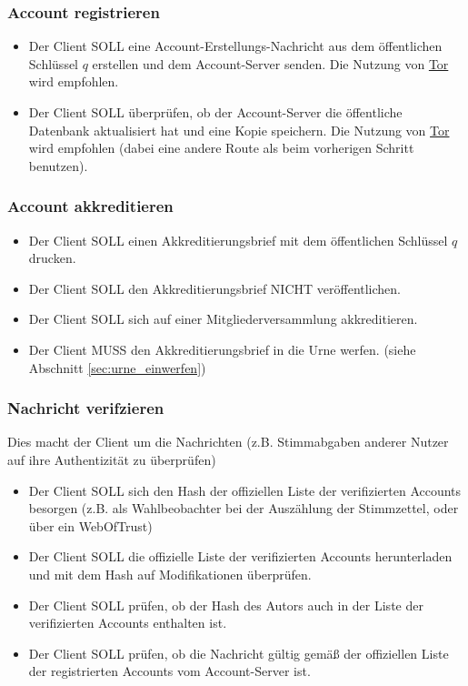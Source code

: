\documentclass[a4paper,10pt]{article}
\begin{document}
\subsubsection{Account registrieren}
\begin{itemize}
 \item Der Client SOLL eine Account-Erstellungs-Nachricht aus dem öffentlichen Schlüssel $q$ erstellen und dem Account-Server senden. Die Nutzung von \href{https://www.torproject.org/}{Tor} wird empfohlen.
 \item Der Client SOLL überprüfen, ob der Account-Server die öffentliche Datenbank aktualisiert hat und eine Kopie speichern. Die Nutzung von \href{https://www.torproject.org/}{Tor} wird empfohlen (dabei eine andere Route als beim vorherigen Schritt benutzen).
\end{itemize}

\subsubsection{Account akkreditieren}
\begin{itemize}
 \item Der Client SOLL einen Akkreditierungsbrief mit dem öffentlichen Schlüssel $q$ drucken.
 \item Der Client SOLL den Akkreditierungsbrief NICHT veröffentlichen. 
 \item Der Client SOLL sich auf einer Mitgliederversammlung akkreditieren.
 \item Der Client MUSS den Akkreditierungsbrief in die Urne werfen. (siehe Abschnitt \ref{sec:urne_einwerfen})
\end{itemize}

\subsubsection{Nachricht verifzieren}
Dies macht der Client um die Nachrichten (z.B. Stimmabgaben anderer Nutzer auf ihre Authentizität zu überprüfen)
\begin{itemize}
 \item Der Client SOLL sich den Hash der offiziellen Liste der verifizierten Accounts besorgen (z.B. als Wahlbeobachter bei der Auszählung der Stimmzettel, oder über ein WebOfTrust)
 \item Der Client SOLL die offizielle Liste der verifizierten Accounts herunterladen und mit dem Hash auf Modifikationen überprüfen.
 \item Der Client SOLL prüfen, ob der Hash des Autors auch in der Liste der verifizierten Accounts enthalten ist.
 \item Der Client SOLL prüfen, ob die Nachricht gültig gemäß der offiziellen Liste der registrierten Accounts vom Account-Server ist.
\end{itemize}
\end{document}
